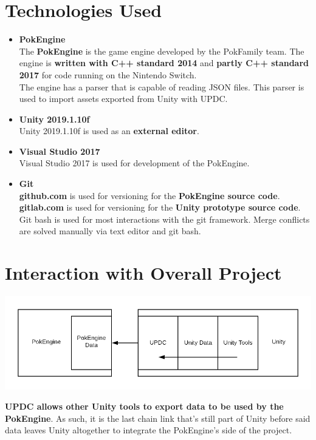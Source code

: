 \documentclass[12pt,a4paper]{article}
\begin{document}
\section{Technologies Used}
\begin{itemize}
	\item \textbf{PokEngine}\\
		The \textbf{PokEngine} is the game engine developed by the PokFamily team. The engine is \textbf{written with C++ standard 2014} and \textbf{partly C++ standard 2017} for code running on the Nintendo Switch.\\
The engine has a parser that is capable of reading JSON files. This parser is used to import assets exported from Unity with UPDC.

	\item \textbf{Unity 2019.1.10f}\\
		Unity 2019.1.10f is used as an \textbf{external editor}.
	
	\item \textbf{Visual Studio 2017}\\
		Visual Studio 2017 is used for development of the PokEngine.
	
	\item \textbf{Git}\\
		\textbf{github.com} is used for versioning for the \textbf{PokEngine source code}. \textbf{gitlab.com} is used for versioning for the \textbf{Unity prototype source code}. Git bash is used for most interactions with the git framework. Merge conflicts are solved manually via text editor and git bash.
		
\end{itemize}

\section{Interaction with Overall Project}
\begin{center}
\includegraphics[scale=0.5]{UPDCLocation}
\end{center}
\textbf{UPDC allows other Unity tools to export data to be used by the PokEngine}. As such, it is the last chain link that's still part of Unity before said data leaves Unity altogether to integrate the PokEngine's side of the project.
\end{document}
